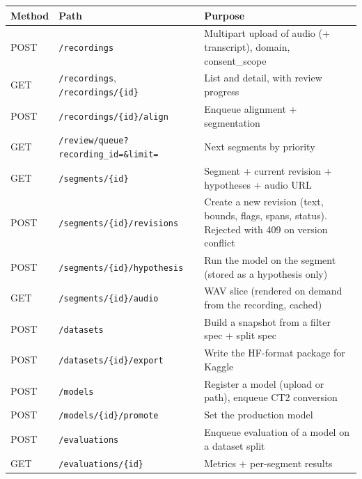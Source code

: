 \documentclass[11pt]{article}
\begin{document}
\begin{longtable}[]{@{}>{\raggedright\arraybackslash}p{}>{\raggedright\arraybackslash}p{}>{\raggedright\arraybackslash}p{}@{}}
\toprule\noalign{}
Method & Path & Purpose \\
\midrule\noalign{}
\endhead
\bottomrule\noalign{}
\endlastfoot
POST & \texttt{/\allowbreak{}recordings} & Multipart upload of audio (+ transcript), domain, consent\_scope \\
GET & \texttt{/\allowbreak{}recordings}, \texttt{/\allowbreak{}recordings/\allowbreak{}\{id\}} & List and detail, with review progress \\
POST & \texttt{/\allowbreak{}recordings/\allowbreak{}\{id\}/\allowbreak{}align} & Enqueue alignment + segmentation \\
GET & \texttt{/\allowbreak{}review/\allowbreak{}queue?recording\_\allowbreak{}id=\allowbreak{}\&limit=\allowbreak{}} & Next segments by priority \\
GET & \texttt{/\allowbreak{}segments/\allowbreak{}\{id\}} & Segment + current revision + hypotheses + audio URL \\
POST & \texttt{/\allowbreak{}segments/\allowbreak{}\{id\}/\allowbreak{}revisions} & Create a new revision (text, bounds, flags, spans, status). Rejected with 409 on version conflict \\
POST & \texttt{/\allowbreak{}segments/\allowbreak{}\{id\}/\allowbreak{}hypothesis} & Run the model on the segment (stored as a hypothesis only) \\
GET & \texttt{/\allowbreak{}segments/\allowbreak{}\{id\}/\allowbreak{}audio} & WAV slice (rendered on demand from the recording, cached) \\
POST & \texttt{/\allowbreak{}datasets} & Build a snapshot from a filter spec + split spec \\
POST & \texttt{/\allowbreak{}datasets/\allowbreak{}\{id\}/\allowbreak{}export} & Write the HF-format package for Kaggle \\
POST & \texttt{/\allowbreak{}models} & Register a model (upload or path), enqueue CT2 conversion \\
POST & \texttt{/\allowbreak{}models/\allowbreak{}\{id\}/\allowbreak{}promote} & Set the production model \\
POST & \texttt{/\allowbreak{}evaluations} & Enqueue evaluation of a model on a dataset split \\
GET & \texttt{/\allowbreak{}evaluations/\allowbreak{}\{id\}} & Metrics + per-segment results \\

\end{longtable}
\end{document}
